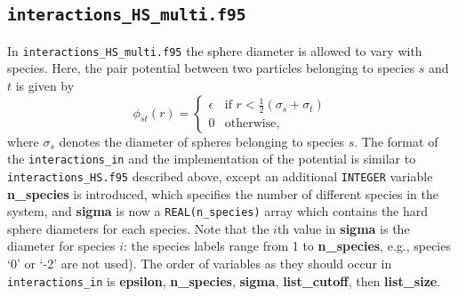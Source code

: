 \documentclass{report}
\begin{document}
\subsection{\texttt{interactions\_HS\_multi.f95}}
In \texttt{interactions\_HS\_multi.f95} the sphere diameter is allowed to vary with species. Here, the pair potential between two particles
belonging to species $s$ and $t$ is given by
\begin{equation}
\phi_{st}(r)=
\begin{cases} 
\epsilon & \text{if }r<\frac{1}{2}(\sigma_s+\sigma_t) \\
0 & \text{otherwise},
\end{cases}
\end{equation}
where $\sigma_s$ denotes the diameter of spheres belonging to species $s$. The format of the \texttt{interactions\_in}
and the implementation of the potential is similar to \texttt{interactions\_HS.f95} described above, except an additional
\texttt{INTEGER} variable \textbf{n\_species} is introduced, which specifies the number of different species in the system,
and \textbf{sigma} is now a \texttt{REAL(n\_species)} array which contains the hard sphere diameters for each species. Note
that the $i$th value in \textbf{sigma} is the diameter for species $i$: the species labels range from 1 to 
\textbf{n\_species}, e.g., species `0' or `-2' are not used).
The order of variables as they should occur in \texttt{interactions\_in} is \textbf{epsilon}, \textbf{n\_species}, \textbf{sigma}, 
\textbf{list\_cutoff}, then \textbf{list\_size}.
\end{document}
